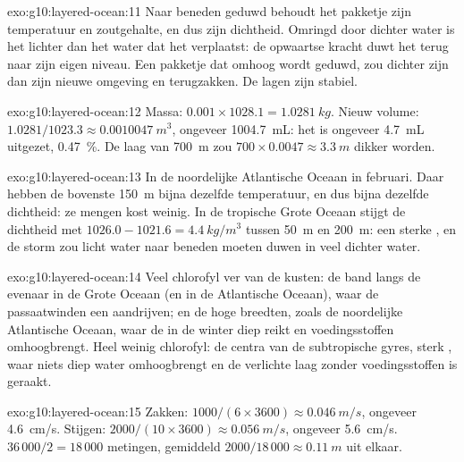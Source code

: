 \begin{solution}{exo:g10:layered-ocean:11}
Naar beneden geduwd behoudt het pakketje zijn temperatuur en zoutgehalte, en dus
zijn dichtheid. Omringd door dichter water is het lichter dan het water dat het
verplaatst: de opwaartse kracht duwt het terug naar zijn eigen niveau. Een
pakketje dat omhoog wordt geduwd, zou dichter zijn dan zijn nieuwe omgeving en
terugzakken. De lagen zijn stabiel.
\end{solution}

\begin{solution}{exo:g10:layered-ocean:12}
Massa: $0.001 \times 1028.1 = \qty{1.0281}{kg}$. Nieuw volume: $1.0281/1023.3
\approx \qty{0.0010047}{m^3}$, ongeveer \qty{1004.7}{mL}: het is ongeveer
\qty{4.7}{mL} uitgezet, \qty{0.47}{\percent}. De laag van \qty{700}{m} zou
$700 \times 0.0047 \approx \qty{3.3}{m}$ dikker worden.
\end{solution}

\begin{solution}{exo:g10:layered-ocean:13}
In de noordelijke Atlantische Oceaan in februari. Daar hebben de bovenste
\qty{150}{m} bijna dezelfde temperatuur, en dus bijna dezelfde dichtheid: ze
mengen kost weinig. In de tropische Grote Oceaan stijgt de dichtheid met $1026.0 - 1021.6 =
\qty{4.4}{kg/m^3}$ tussen \qty{50}{m} en \qty{200}{m}: een sterke , en de storm zou licht water naar beneden moeten duwen in veel
dichter water.
\end{solution}

\begin{solution}{exo:g10:layered-ocean:14}
Veel chlorofyl ver van de kusten: de band langs de evenaar in de Grote Oceaan
(en in de Atlantische Oceaan), waar de passaatwinden een  aandrijven; en
de hoge breedten, zoals de noordelijke Atlantische Oceaan, waar de 
in de winter diep reikt en voedingsstoffen omhoogbrengt. Heel weinig chlorofyl:
de centra van de subtropische gyres, sterk , waar niets diep water
omhoogbrengt en de verlichte laag zonder voedingsstoffen is geraakt.
\end{solution}

\begin{solution}{exo:g10:layered-ocean:15}
Zakken: $1000/(6 \times 3600) \approx \qty{0.046}{m/s}$, ongeveer
\qty{4.6}{cm/s}. Stijgen: $2000/(10 \times 3600) \approx \qty{0.056}{m/s}$,
ongeveer \qty{5.6}{cm/s}. $36\,000/2 = 18\,000$ metingen, gemiddeld
$2000/18\,000 \approx \qty{0.11}{m}$ uit elkaar.
\end{solution}

